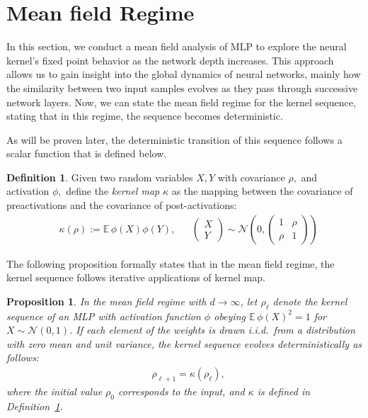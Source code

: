 \documentclass[twoside]{article}
\newcommand{\E}{\mathbb{E}\,}
\newtheorem{proposition}{Proposition}
\theoremstyle{definition}
\newtheorem{definition}{Definition}
\begin{document}
\section{Mean field Regime}

In this section, we conduct a mean field analysis of MLP to explore the neural kernel's fixed point behavior as the network depth increases. This approach allows us to gain insight into the global dynamics of neural networks, mainly how the similarity between two input samples evolves as they pass through successive network layers.
Now, we can state the mean field regime for the kernel sequence, stating that in this regime, the sequence becomes deterministic. 

As will be proven later, the deterministic transition of this sequence follows a scalar function that is defined below. 

\begin{definition}
    \label{def:kernel_map}
Given two random variables $X, Y$ with covariance $\rho,$ and activation $\phi,$ define the \emph{kernel map } $\kappa$ as the mapping between the covariance of preactivations and the covariance of post-activations:
\begin{align}
& \kappa(\rho):=\E\phi(X)\phi(Y), && 
 \begin{pmatrix}X \\ Y\end{pmatrix}\sim \mathcal N\left(0, \begin{pmatrix} 1 & \rho \\ \rho & 1 \end{pmatrix}
 \right)
 \label{eq:kernel_map}
\end{align}
\end{definition}

The following proposition formally states that in the mean field regime, the kernel sequence follows iterative applications of kernel map. 

\begin{proposition}
\label{prop:mean_field_kernel_general}
In the mean field regime with $d \to \infty$, let $\rho_\ell$ denote the kernel sequence of an MLP with activation function $\phi$ obeying $\E\phi(X)^2=1$ for $X\sim \mathcal N(0,1)$. If each element of the weights is drawn i.i.d.~from a distribution with zero mean and unit variance, the kernel sequence evolves deterministically as follows:
\begin{align*}
&\rho_{\ell+1} = \kappa(\rho_\ell),
\end{align*}
where the initial value $\rho_0$ corresponds to the input, and $\kappa$ is defined in Definition~\ref{def:kernel_map}. 


\end{proposition}
\end{document}
